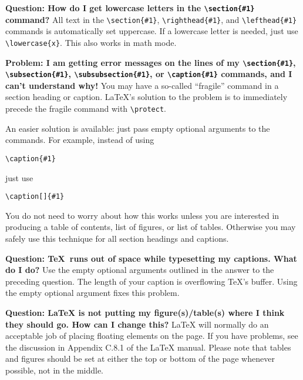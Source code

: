  
{\bf Question: How do I get lowercase letters in the \verb+\section{#1}+
command?} All text in the \verb+\section{#1}+,
\verb+\righthead{#1}+, and \verb+\lefthead{#1}+ commands is automatically set
uppercase. If a lowercase letter is needed, just use \verb+\lowercase{x}+.
This also works in math mode.
 
{\bf Problem: I am getting error messages on the lines of my
\verb+\section{#1}+,
\verb+\subsection{#1}+,
\verb+\subsubsection{#1}+, or
\verb+\caption{#1}+ commands, and I can't understand why!}
You may have a so-called ``fragile'' command in a section heading or
caption. \LaTeX's solution to the problem is to immediately precede the
fragile command with \verb+\protect+.
 
An easier solution is available: just pass empty optional arguments to the
commands. For example, instead of using
\se\begin{verbatim}
\caption{#1}
\end{verbatim}\ee
just use
\se\begin{verbatim}
\caption[]{#1}
\end{verbatim}\ee
You do not need to worry about how this works unless you are interested in
producing a table of contents, list of figures, or list of tables. Otherwise
you may safely use this technique for all section headings and captions.
 
{\bf Question: \TeX\ runs out of space while typesetting my captions. What
do I do?} Use the empty optional arguments outlined in the answer to the
preceding question. The length of your caption is overflowing TeX's buffer.
Using the empty  optional argument fixes this problem.
 
 
{\bf Question: \LaTeX{} is not putting my figure(s)/table(s) where I
think they should go. How can I change this?} \LaTeX{} will normally do an
acceptable job of placing floating elements on the page. If you have problems,
see the discussion in
Appendix C.8.1 of the \LaTeX{} manual.
Please note that tables and figures should be set at either the top or bottom
of the page whenever possible, not in the middle.
 



